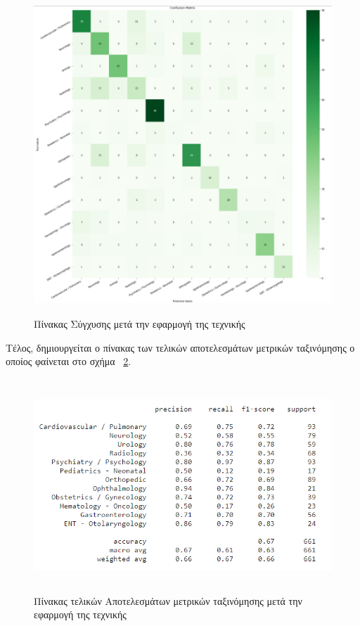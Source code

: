 \begin{figure} [ht!]
\centering
\includegraphics[width=\textwidth,height=12cm,keepaspectratio]{pictures/5.10CMatrix3.png} 
\caption{Πίνακας Σύγχυσης μετά την εφαρμογή της τεχνικής }\label{figure5.10}
\end{figure}

\clearpage
Τέλος, δημιουργείται ο πίνακας των τελικών αποτελεσμάτων μετρικών ταξινόμησης ο οποίος φαίνεται στο σχήμα ~\ref{figure5.11}.

\begin{figure} [ht!]
\centering
\includegraphics[width=\textwidth,height=8cm,keepaspectratio]{pictures/5.11results3.png} 
\caption{Πίνακας τελικών Αποτελεσμάτων μετρικών ταξινόμησης μετά την εφαρμογή της τεχνικής }\label{figure5.11}
\end{figure}

